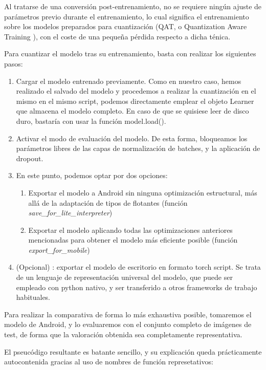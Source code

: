 Al tratarse de una conversión post-entrenamiento, no se requiere ningún ajuste de parámetros previo durante el entrenamiento, lo cual significa el entrenamiento sobre los modelos preparados para cuantización (QAT, o Quantization Aware Training  \cite{kuzmin2024fp8}), con el coste de una pequeña pérdida respecto a dicha ténica.

Para cuantizar el modelo tras su entrenamiento, basta con realizar los siguientes pasos:
\begin{enumerate}
	\item Cargar el modelo entrenado previamente. Como en nuestro caso, hemos realizado el salvado del modelo y procedemos a realizar la cuantización en el mismo en el mismo script, podemos directamente emplear el objeto Learner que almacena el modelo completo. En caso de que se quisiese leer de disco duro, bastaría con usar la función model.load().
	\item Activar el modo de evaluación del modelo. De esta forma, bloqueamos los parámetros libres de las capas de normalización de batches, y la aplicación de dropout.
	\item En este punto, podemos optar por dos opciones:
	\begin{enumerate}
		\item Exportar el modelo a Android sin ninguna optimización estructural, más allá de la adaptación de tipos de flotantes (función \textit{save\_for\_lite\_interpreter})
		\item Exportar el modelo aplicando todas las optimizaciones anteriores mencionadas para obtener el modelo más eficiente posible (función \textit{export\_for\_mobile})
	\end{enumerate}
	\item (Opcional) : exportar el modelo de escritorio en formato torch script. Se trata de un lenguaje de representación universal del modelo, que puede ser empleado con python nativo, y ser transferido a otros frameworks de trabajo habituales.
		
\end{enumerate}

Para realizar la comparativa de forma lo más exhaustiva posible, tomaremos el modelo de Android, y lo evaluaremos con el conjunto completo de imágenes de test, de forma que la valoración obtenida sea completamente representativa.

El pseucódigo resultante es batante sencillo, y su explicación queda prácticamente autocontenida gracias al uso de nombres de función represetativos:

